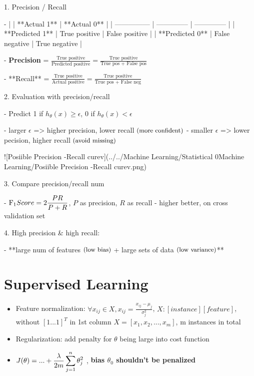 1. Precision / Recall

- |                 | **Actual 1**   | **Actual 0**   |
| --------------- | -------------- | -------------- |
| **Predicted 1** | True positive  | False positive |
| **Predicted 0** | False negative | True negative  |

- \textbf{Precision} = $\displaystyle \frac{\text {True positive}}{\text{Predicted positive}} = \frac{\text {True positive}}{\text{True pos + False pos}}$

- **Recall** = $\displaystyle \frac{\text{True positive}}{\text{Actual positive}} = \frac{\text{True positive}}{\text{True pos + False neg}}$

2. Evaluation with precision/recall

- Predict 1 if $ h_\theta(x) \geq \epsilon$, 0 if $h_\theta(x) < \epsilon$

- larger $\epsilon$ => higher precision, lower recall $\small \text{(more confident)}$ 
- smaller $\epsilon$ => lower pecision, higher recall $\small \text{(avoid missing)}$       

![Posiible Precision -Recall curev](../../Machine Learning/Statistical 0Machine Learning/Posiible Precision -Recall curev.png)  

3. Compare precision/recall num

- $\displaystyle \text{F}_1 \space  Score = 2\frac{PR}{P+R}$, $P$ as precision, $R$ as recall
- higher better, on cross validation set

4. High precision \& high recall:

- **large num of features $\small\text{(low bias)}$ + large sets of data $\small\text{(low variance)}$**


\section{Supervised Learning}
\begin{itemize}

\item Feature normalization: $\forall x_{ij} \in X, x_{ij}=\frac{x_{ij}-\mu_j}{\sigma_j^2}$, $ X:[instance][feature]$, without $[1...1]^T$ in 1st column $X=[x_1,x_2,...,x_m]$, m instances in total
\item Regularization: add penalty for $\theta$ being large into cost function
\item $\displaystyle J(\theta)= \space... + \frac{\lambda}{2m}\sum^n_{j=1}\theta_j^2$ , \textbf{bias $\theta_0$ shouldn't be penalized} 

\end{itemize}

